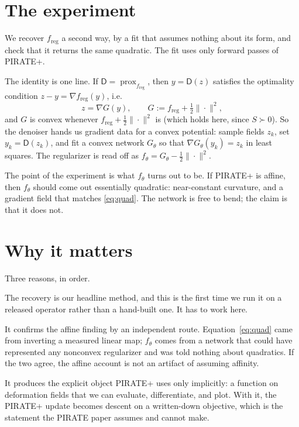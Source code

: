 \documentclass[11pt]{article}
\newcommand{\D}{\mathsf{D}}
\newcommand{\prox}{\operatorname{prox}}
\newcommand{\freg}{f_{\mathrm{reg}}}
\begin{document}
\section{The experiment}

We recover $\freg$ a second way, by a fit that assumes nothing about its form, and check that it returns the same quadratic. The fit uses only forward passes of PIRATE+.

The identity is one line. If $\D = \prox_{\freg}$, then $y = \D(z)$ satisfies the optimality condition $z - y = \nabla\freg(y)$, i.e.
\begin{equation}
z = \nabla G(y), \qquad G := \freg + \tfrac12\|\cdot\|^2 ,
\label{eq:grad}
\end{equation}
and $G$ is convex whenever $\freg + \tfrac12\|\cdot\|^2$ is (which holds here, since $S \succ 0$). So the denoiser hands us gradient data for a convex potential: sample fields $z_k$, set $y_k = \D(z_k)$, and fit a convex network $G_\theta$ so that $\nabla G_\theta(y_k) = z_k$ in least squares. The regularizer is read off as $f_\theta = G_\theta - \tfrac12\|\cdot\|^2$.

The point of the experiment is what $f_\theta$ turns out to be. If PIRATE+ is affine, then $f_\theta$ should come out essentially quadratic: near-constant curvature, and a gradient field that matches \eqref{eq:quad}. The network is free to bend; the claim is that it does not.

\section{Why it matters}

Three reasons, in order.

The recovery is our headline method, and this is the first time we run it on a released operator rather than a hand-built one. It has to work here.

It confirms the affine finding by an independent route. Equation~\eqref{eq:quad} came from inverting a measured linear map; $f_\theta$ comes from a network that could have represented any nonconvex regularizer and was told nothing about quadratics. If the two agree, the affine account is not an artifact of assuming affinity.

It produces the explicit object PIRATE+ uses only implicitly: a function on deformation fields that we can evaluate, differentiate, and plot. With it, the PIRATE+ update becomes descent on a written-down objective, which is the statement the PIRATE paper assumes and cannot make.
\end{document}
